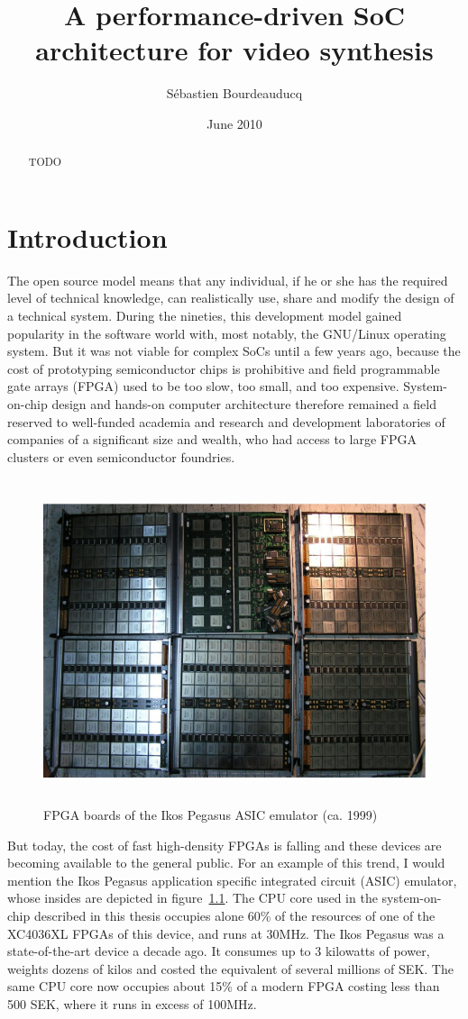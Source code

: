 \documentclass[a4paper,11pt]{kthesis}
\title{A performance-driven SoC architecture for video synthesis}
\date{June 2010}
\author{S\'ebastien Bourdeauducq}
\begin{document}
\begin{abstract}
TODO
\end{abstract}

\tableofcontents
\listoffigures

\mainmatter

\chapter{Introduction}
The open source model means that any individual, if he or she has the required level of technical knowledge, can realistically use, share and modify the design of a technical system. During the nineties, this development model gained popularity in the software world with, most notably, the GNU/Linux operating system. But it was not viable for complex SoCs until a few years ago, because the cost of prototyping semiconductor chips is prohibitive  and field programmable gate arrays (FPGA) used to be too slow, too small, and too expensive. System-on-chip design and hands-on computer architecture therefore remained a field reserved to well-funded academia and research and development laboratories of companies of a significant size and wealth, who had access to large FPGA clusters or even semiconductor foundries.

\begin{figure}[htp]
\centering
\includegraphics[height=95mm]{ikosboards.eps}
\caption{FPGA boards of the Ikos Pegasus ASIC emulator (ca. 1999)}
\label{fig:ikos}
\end{figure}

But today, the cost of fast high-density FPGAs is falling and these devices are becoming available to the general public. For an example of this trend, I would mention the Ikos Pegasus application specific integrated circuit (ASIC) emulator, whose insides are depicted in figure~\ref{fig:ikos}. The CPU core used in the system-on-chip described in this thesis occupies alone 60\% of the resources of one of the XC4036XL FPGAs of this device, and runs at 30MHz. The Ikos Pegasus was a state-of-the-art device a decade ago. It consumes up to 3 kilowatts of power, weights dozens of kilos and costed the equivalent of several millions of SEK. The same CPU core now occupies about 15\% of a modern FPGA costing less than 500 SEK, where it runs in excess of 100MHz.
\end{document}
